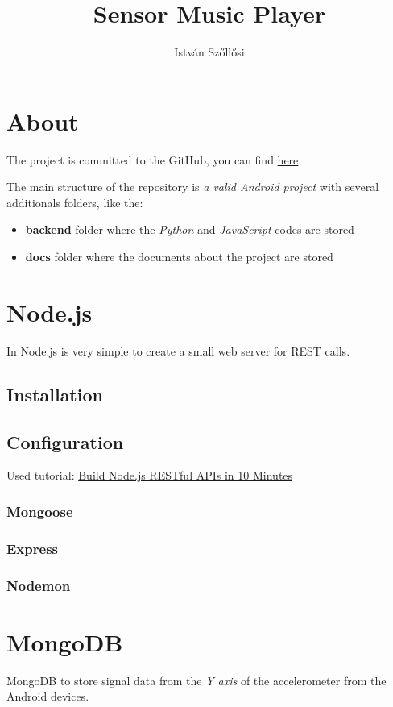\documentclass[12pt, a4paper, portrait]{article}
\title{\textbf{Sensor Music Player}}
\author{István Szőllősi}
\begin{document}
\maketitle
\newpage

\tableofcontents
\newpage

\section{About}
The project is committed to the GitHub, you can find \href{https://github.com/I-sty/SensorMusicPlayer/}{here}.
\par The main structure of the repository is
\textit{a valid Android project} with several additionals folders, like the:
\begin{itemize}
\item{\textbf{backend}} folder where the \textit{Python} and \textit{JavaScript} codes are stored
\item{\textbf{docs}} folder where the documents about the project are stored
\end{itemize}
\section{Node.js}
In Node.js is very simple to create a small web server for REST calls.
\subsection{Installation}
\subsection{Configuration}
Used tutorial: \href{https://www.codementor.io/olatundegaruba/nodejs-restful-apis-in-10-minutes-q0sgsfhbd}{Build Node.js RESTful APIs in 10 Minutes}
\subsubsection{Mongoose}
\subsubsection{Express}
\subsubsection{Nodemon}

\section{MongoDB}
MongoDB to store signal data from the \textit{Y axis} of the accelerometer from the Android devices.
\end{document}

